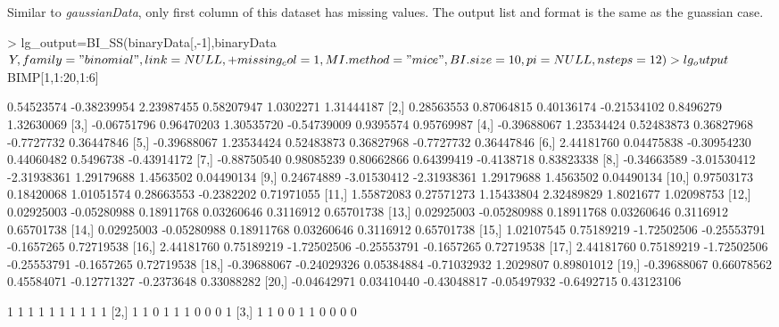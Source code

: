 \documentclass[a4paper]{article}
\begin{document}
Similar to \emph{gaussianData}, only first column of this dataset has missing values. The output list and format is the same as the guassian case.
\begin{Schunk}
\begin{Sinput}
> lg_output=BI_SS(binaryData[,-1],binaryData$Y,family="binomial",link=NULL,
+                 missing_col=1,MI.method="mice",BI.size=10,pi=NULL,nsteps=12)
> lg_output$BIMP[1,1:20,1:6]
\end{Sinput}
\begin{Soutput}
             [,1]        [,2]        [,3]        [,4]       [,5]        [,6]
 [1,]  0.54523574 -0.38239954  2.23987455  0.58207947  1.0302271  1.31444187
 [2,]  0.28563553  0.87064815  0.40136174 -0.21534102  0.8496279  1.32630069
 [3,] -0.06751796  0.96470203  1.30535720 -0.54739009  0.9395574  0.95769987
 [4,] -0.39688067  1.23534424  0.52483873  0.36827968 -0.7727732  0.36447846
 [5,] -0.39688067  1.23534424  0.52483873  0.36827968 -0.7727732  0.36447846
 [6,]  2.44181760  0.04475838 -0.30954230  0.44060482  0.5496738 -0.43914172
 [7,] -0.88750540  0.98085239  0.80662866  0.64399419 -0.4138718  0.83823338
 [8,] -0.34663589 -3.01530412 -2.31938361  1.29179688  1.4563502  0.04490134
 [9,]  0.24674889 -3.01530412 -2.31938361  1.29179688  1.4563502  0.04490134
[10,]  0.97503173  0.18420068  1.01051574  0.28663553 -0.2382202  0.71971055
[11,]  1.55872083  0.27571273  1.15433804  2.32489829  1.8021677  1.02098753
[12,]  0.02925003 -0.05280988  0.18911768  0.03260646  0.3116912  0.65701738
[13,]  0.02925003 -0.05280988  0.18911768  0.03260646  0.3116912  0.65701738
[14,]  0.02925003 -0.05280988  0.18911768  0.03260646  0.3116912  0.65701738
[15,]  1.02107545  0.75189219 -1.72502506 -0.25553791 -0.1657265  0.72719538
[16,]  2.44181760  0.75189219 -1.72502506 -0.25553791 -0.1657265  0.72719538
[17,]  2.44181760  0.75189219 -1.72502506 -0.25553791 -0.1657265  0.72719538
[18,] -0.39688067 -0.24029326  0.05384884 -0.71032932  1.2029807  0.89801012
[19,] -0.39688067  0.66078562  0.45584071 -0.12771327 -0.2373648  0.33088282
[20,] -0.04642971  0.03410440 -0.43048817 -0.05497932 -0.6492715  0.43123106
\end{Soutput}
\begin{Soutput}
      [,1] [,2] [,3] [,4] [,5] [,6] [,7] [,8] [,9] [,10]
 [1,]    1    1    1    1    1    1    1    1    1     1
 [2,]    1    1    0    1    1    1    0    0    0     1
 [3,]    1    1    0    0    1    1    0    0    0     0

\end{Soutput}
\end{Schunk}
\end{document}
